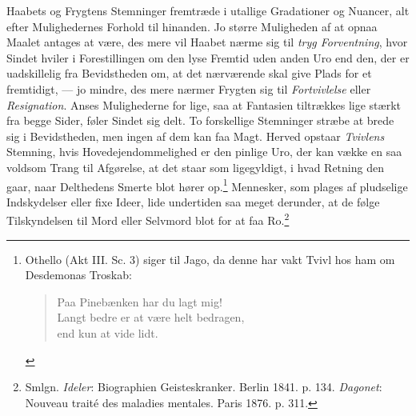 \documentclass[12pt,a4paper,openany]{book}
\newcommand{\opage}[1]{\marginnote{\footnotesize\textit{[#1]}}}
\begin{document}
Haabets og Frygtens Stemninger fremtræde i utallige Gradationer og
Nuancer, alt efter Mulighedernes Forhold til hinanden. Jo større
Muligheden af at opnaa Maalet antages at være, des mere vil Haabet nærme
sig til \emph{tryg Forventning}, hvor Sindet hviler i Forestillingen om
den lyse Fremtid uden anden Uro end den, der er uadskillelig fra
Bevidstheden om, at det nærværende skal give Plads for et fremtidigt,
--- jo mindre, des mere nærmer Frygten sig til \emph{Fortvivlelse} eller
\emph{Resignation}. Anses Mulighederne for lige, saa at Fantasien
tiltrækkes lige stærkt fra begge Sider, føler Sindet sig delt. To
forskellige Stemninger stræbe at brede sig i Bevidstheden, men ingen af
dem kan faa Magt. Herved opstaar \emph{Tvivlens} Stemning, hvis
Hovedejendommelighed er den pinlige Uro, der
\opage{286}kan vække en saa voldsom Trang til Afgørelse, at det staar
som ligegyldigt, i hvad Retning den gaar, naar Delthedens Smerte blot
hører op.\footnote[1]{Othello (Akt III. Sc. 3) siger til Jago, da denne
har vakt Tvivl hos ham om Desdemonas Troskab:
\begin{verse}
Paa Pinebænken har du lagt mig!\\
Langt bedre er at være helt bedragen,\\
end kun at vide lidt.
\end{verse}} Mennesker, som plages af
pludselige Indskydelser eller fixe Ideer, lide undertiden saa meget
derunder, at de følge Tilskyndelsen til Mord eller Selvmord blot for at
faa Ro.\footnote[2]{Smlgn. \emph{Ideler}: Biographien Geisteskranker.
Berlin 1841. p. 134. \emph{Dagonet}: Nouveau traité des maladies
mentales. Paris 1876. p. 311.}
\end{document}
